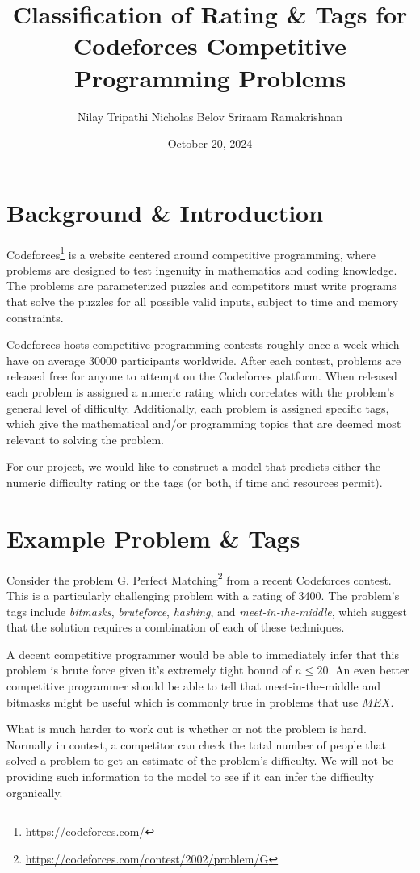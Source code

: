\documentclass{article}
\title{Classification of Rating \& Tags for Codeforces Competitive Programming Problems}
\author{Nilay Tripathi \hspace{\authorspace} Nicholas Belov \hspace{\authorspace} Sriraam Ramakrishnan}
\date{October 20, 2024}
\begin{document}
        \maketitle
        \section{Background \& Introduction}
 Codeforces\footnote{\href{https://codeforces.com}{https://codeforces.com/}} is a website centered around competitive programming, where problems are designed to test ingenuity in mathematics and coding knowledge. The problems are parameterized puzzles and competitors must write programs that solve the puzzles for all possible valid inputs, subject to time and memory constraints. \par Codeforces hosts competitive programming contests roughly once a week which have on average 30000 participants worldwide. After each contest, problems are released free for anyone to attempt on the Codeforces platform. When released each problem is assigned a numeric rating which correlates with the problem's general level of difficulty. Additionally, each problem is assigned specific tags, which give the mathematical and/or programming topics that are deemed most relevant to solving the problem. \par 
 For our project, we would like to construct a model that predicts either the numeric difficulty rating or the tags (or both, if time and resources permit). 
        \section{Example Problem \& Tags}
 Consider the problem G. Perfect Matching\footnote{\href{G. Perfect Matching}{https://codeforces.com/contest/2002/problem/G}} from a  recent Codeforces contest. This is a particularly challenging problem with a rating of 3400. The problem's tags include \textit{bitmasks}, \textit{bruteforce}, \textit{hashing}, and \textit{meet-in-the-middle}, which suggest that the solution requires a combination of each of these techniques.  \par
 A decent competitive programmer would be able to immediately infer that this problem is brute force given it's extremely tight bound of $n \leq 20$. An even better competitive programmer should be able to tell that meet-in-the-middle and bitmasks might be useful which is commonly true in problems that use $MEX$. \par
 What is much harder to work out is whether or not the problem is hard. Normally in contest, a competitor can check the total number of people that solved a problem to get an estimate of the problem's difficulty. We will not be providing such information to the model to see if it can infer the difficulty organically. 
\end{document}

